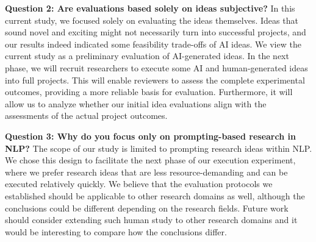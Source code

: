 \textbf{Question 2: Are evaluations based solely on ideas subjective?}
In this current study, we focused solely on evaluating the ideas themselves. Ideas that sound novel and exciting might not necessarily turn into successful projects, and our results indeed indicated some feasibility trade-offs of AI ideas. 
We view the current study as a preliminary evaluation of AI-generated ideas. In the next phase, we will recruit researchers to execute some AI and human-generated ideas into full projects. This will enable reviewers to assess the complete experimental outcomes, providing a more reliable basis for evaluation. Furthermore, it will allow us to analyze whether our initial idea evaluations align with the assessments of the actual project outcomes.


\textbf{Question 3: Why do you focus only  on prompting-based research in NLP?} 
The scope of our study is limited to prompting research ideas within NLP. We chose this design to facilitate the next phase of our execution experiment, where we prefer research ideas that are less resource-demanding and can be executed relatively quickly. 
We believe that the evaluation protocols we established should be applicable to other research domains as well, although the conclusions could be different depending on the research fields. 
Future work should consider extending such human study to other research domains and it would be interesting to compare how the conclusions differ. 

